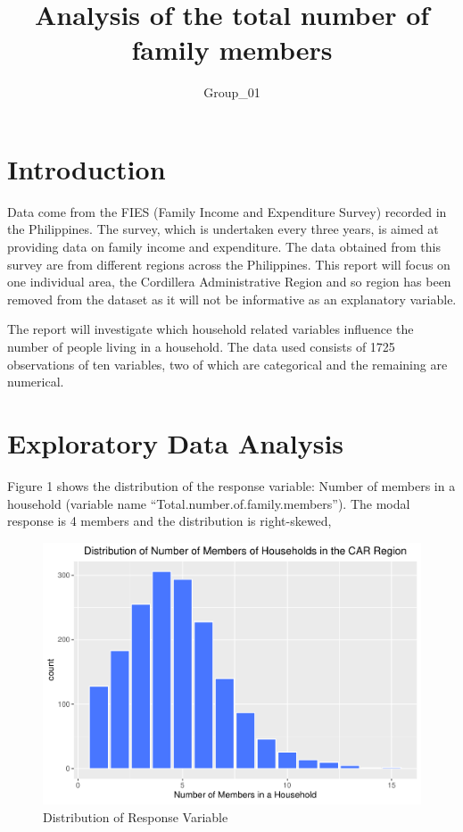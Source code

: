\documentclass[
]{article}
\title{Analysis of the total number of family members}
\author{Group\_01}
\date{}
\begin{document}
\maketitle

\hypertarget{sec:Intro}{%
\section{Introduction}\label{sec:Intro}}

Data come from the FIES (Family Income and Expenditure Survey) recorded
in the Philippines. The survey, which is undertaken every three years,
is aimed at providing data on family income and expenditure. The data
obtained from this survey are from different regions across the
Philippines. This report will focus on one individual area, the
Cordillera Administrative Region and so region has been removed from the
dataset as it will not be informative as an explanatory variable.

The report will investigate which household related variables influence
the number of people living in a household. The data used consists of
1725 observations of ten variables, two of which are categorical and the
remaining are numerical.

\hypertarget{sec:EDA}{%
\section{Exploratory Data Analysis}\label{sec:EDA}}

Figure 1 shows the distribution of the response variable: Number of
members in a household (variable name
``Total.number.of.family.members''). The modal response is 4 members and
the distribution is right-skewed,

\begin{figure}[H]

{\centering \includegraphics[width=0.8\linewidth]{Group_01_files/figure-latex/distribution of response variable-1} 

}

\caption{Distribution of Response Variable}\label{fig:distribution of response variable}
\end{figure}
\end{document}
